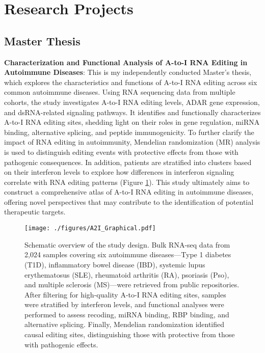 \section{Research Projects}
\subsection{Master Thesis}
\textbf{Characterization and Functional Analysis of A-to-I RNA Editing in Autoimmune Diseases}: This is my independently conducted Master’s thesis, which explores the characteristics and functions of A-to-I RNA editing across six common autoimmune diseases. Using RNA sequencing data from multiple cohorts, the study investigates A-to-I RNA editing levels, ADAR gene expression, and dsRNA-related signaling pathways. It identifies and functionally characterizes A-to-I RNA editing sites, shedding light on their roles in gene regulation, miRNA binding, alternative splicing, and peptide immunogenicity. To further clarify the impact of RNA editing in autoimmunity, Mendelian randomization (MR) analysis is used to distinguish editing events with protective effects from those with pathogenic consequences. In addition, patients are stratified into clusters based on their interferon levels to explore how differences in interferon signaling correlate with RNA editing patterns (Figure \ref{fig:roadmap}). This study ultimately aims to construct a comprehensive atlas of A-to-I RNA editing in autoimmune diseases, offering novel perspectives that may contribute to the identification of potential therapeutic targets.
\begin{figure}[ht]
    \centering
    \texttt{[image: ./figures/A2I\_Graphical.pdf]}
    \caption{
        Schematic overview of the study design. Bulk RNA-seq data from 2,024 samples covering six autoimmune diseases—Type 1 diabetes (T1D), inflammatory bowel disease (IBD), systemic lupus erythematosus (SLE), rheumatoid arthritis (RA), psoriasis (Pso), and multiple sclerosis (MS)—were retrieved from public repositories. After filtering for high-quality A-to-I RNA editing sites, samples were stratified by interferon levels, and functional analyses were performed to assess recoding, miRNA binding, RBP binding, and alternative splicing. Finally, Mendelian randomization identified causal editing sites, distinguishing those with protective from those with pathogenic effects.
    }
    \label{fig:roadmap}
\end{figure}

